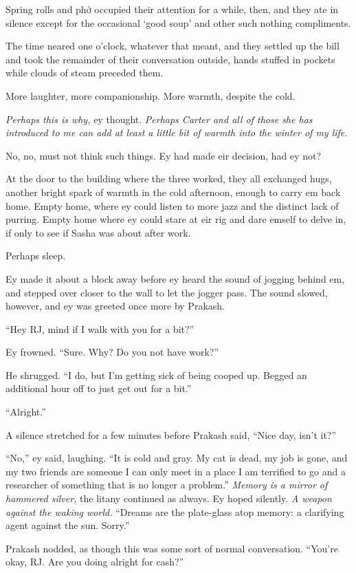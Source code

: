 Spring rolls and phở occupied their attention for a while, then, and they ate in silence except for the occasional `good soup' and other such nothing compliments.

The time neared one o'clock, whatever that meant, and they settled up the bill and took the remainder of their conversation outside, hands stuffed in pockets while clouds of steam preceded them.

More laughter, more companionship. More warmth, despite the cold.

\emph{Perhaps this is why,} ey thought. \emph{Perhaps Carter and all of those she has introduced to me can add at least a little bit of warmth into the winter of my life.}

No, no, must not think such things. Ey had made eir decision, had ey not?

At the door to the building where the three worked, they all exchanged hugs, another bright spark of warmth in the cold afternoon, enough to carry em back home. Empty home, where ey could listen to more jazz and the distinct lack of purring. Empty home where ey could stare at eir rig and dare emself to delve in, if only to see if Sasha was about after work.

Perhaps sleep.

Ey made it about a block away before ey heard the sound of jogging behind em, and stepped over closer to the wall to let the jogger pass. The sound slowed, however, and ey was greeted once more by Prakash.

``Hey RJ, mind if I walk with you for a bit?''

Ey frowned. ``Sure. Why? Do you not have work?''

He shrugged. ``I do, but I'm getting sick of being cooped up. Begged an additional hour off to just get out for a bit.''

``Alright.''

A silence stretched for a few minutes before Prakash said, ``Nice day, isn't it?''

``No,'' ey said, laughing. ``It is cold and gray. My cat is dead, my job is gone, and my two friends are someone I can only meet in a place I am terrified to go and a researcher of something that is no longer a problem.'' \emph{Memory is a mirror of hammered silver,} the litany continued as always. Ey hoped silently. \emph{A weapon against the waking world.} ``Dreams are the plate-glass atop memory: a clarifying agent against the sun. Sorry.''

Prakash nodded, as though this was some sort of normal conversation. ``You're okay, RJ. Are you doing alright for cash?''

